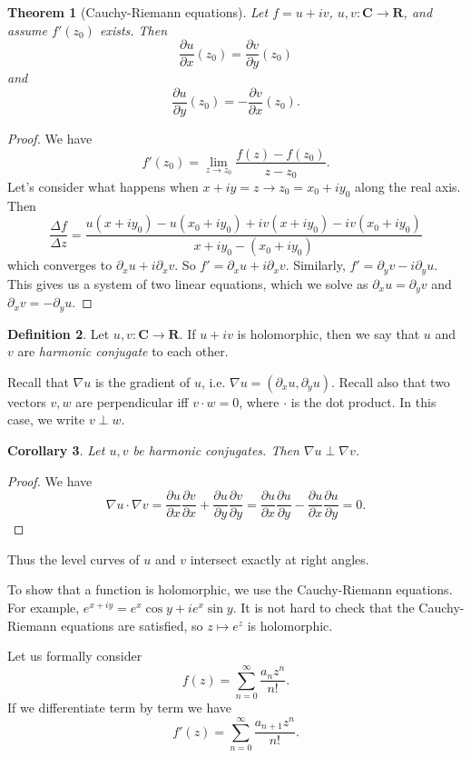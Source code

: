 \documentclass[12pt]{report}
\newcommand{\RR}{\mathbf{R}}
\newcommand{\CC}{\mathbf{C}}
\newcommand{\dfn}[1]{\emph{#1}\index{#1}}
\newtheorem{theorem}{Theorem}[chapter]
\newtheorem{corollary}[theorem]{Corollary}
\theoremstyle{definition}
\newtheorem{definition}[theorem]{Definition}
\theoremstyle{remark}
\begin{document}
\begin{theorem}[Cauchy-Riemann equations]
Let $f = u + iv$, $u, v: \CC \to \RR$, and assume $f'(z_0)$ exists. Then
$$\frac{\partial u}{\partial x}(z_0) = \frac{\partial v}{\partial y}(z_0)$$
and
$$\frac{\partial u}{\partial y}(z_0) = -\frac{\partial v}{\partial x}(z_0).$$
\end{theorem}
\begin{proof}
We have
$$f'(z_0) = \lim_{z \to z_0} \frac{f(z) - f(z_0)}{z - z_0}.$$
Let's consider what happens when $x + iy = z \to z_0 = x_0 + iy_0$ along the real axis. Then
$$\frac{\Delta f}{\Delta z} = \frac{u(x + iy_0) - u(x_0 + iy_0) + iv(x + iy_0) - iv(x_0 + iy_0)}{x + iy_0 - (x_0 + iy_0)}$$
which converges to $\partial_x u + i\partial_x v$. So $f' = \partial_x u + i \partial_x v$. Similarly, $f' = \partial_y v - i\partial_y u$. This gives us a system of two linear equations, which we solve as $\partial_x u = \partial_y v$ and $\partial_x v = -\partial_y u$.
\end{proof}
\begin{definition}
Let $u, v: \CC \to \RR$. If $u + iv$ is holomorphic, then we say that $u$ and $v$ are \dfn{harmonic conjugate} to each other.
\end{definition}
Recall that $\nabla u$ is the gradient of $u$, i.e. $\nabla u = (\partial_x u, \partial_y u)$. Recall also that two vectors $v, w$ are perpendicular iff $v \cdot w = 0$, where $\cdot$ is the dot product. In this case, we write $v \perp w$.
\begin{corollary}
Let $u, v$ be harmonic conjugates. Then $\nabla u \perp \nabla v$.
\end{corollary}
\begin{proof}
We have
$$\nabla u \cdot \nabla v = \frac{\partial u}{\partial x} \frac{\partial v}{\partial x} + \frac{\partial u}{\partial y} \frac{\partial v}{\partial y} = \frac{\partial u}{\partial x} \frac{\partial u}{\partial y} - \frac{\partial u}{\partial x} \frac{\partial u}{\partial y} = 0.$$
\end{proof}
Thus the level curves of $u$ and $v$ intersect exactly at right angles.

To show that a function is holomorphic, we use the Cauchy-Riemann equations. For example, $e^{x+iy} = e^x\cos y + ie^x \sin y$. It is not hard to check that the Cauchy-Riemann equations are satisfied, so $z \mapsto e^z$ is holomorphic.


Let us formally consider
$$f(z) = \sum_{n=0}^\infty \frac{a_nz^n}{n!}.$$
If we differentiate term by term we have
$$f'(z) = \sum_{n=0}^\infty \frac{a_{n+1}z^n}{n!}.$$
\end{document}
